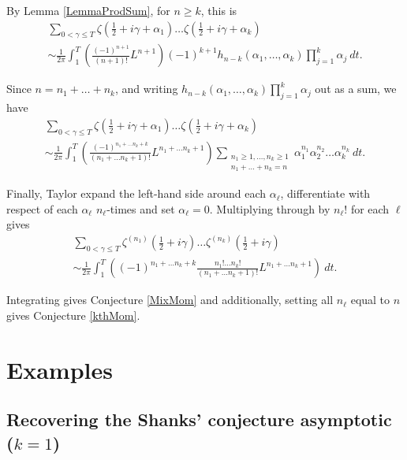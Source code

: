 \documentclass[12pt,a4paper,reqno]{amsart}
\theoremstyle{remark}
\numberwithin{equation}{section}
\begin{document}
By Lemma \ref{LemmaProdSum}, for $n \geq k$, this is
\begin{multline*}
\sum_{0 < \gamma \leq T}  \zeta \left( \frac{1}{2} + i \gamma + \alpha_1 \right)\dots\zeta \left( \frac{1}{2} + i \gamma + \alpha_k \right) \\
\sim \frac{1}{2 \pi} \int_{1}^{T} \left( \frac{(-1)^{n+1}}{(n+1)!} L^{n+1} \right) (-1)^{k+1} h_{n-k}(\alpha_1,\dots,\alpha_k) \prod_{j=1}^k \alpha_j \ dt.
\end{multline*}


Since $n=n_1+\dots +n_k$, and writing $ h_{n-k}(\alpha_1,\dots,\alpha_k) \prod_{j=1}^k \alpha_j $ out as a sum, we have
\begin{multline*}
\sum_{0 < \gamma \leq T}  \zeta \left( \frac{1}{2} + i \gamma + \alpha_1 \right)\dots\zeta \left( \frac{1}{2} + i \gamma + \alpha_k \right) \\
\sim \frac{1}{2 \pi} \int_{1}^{T} \left( \frac{(-1)^{n_1+\dots n_k+k}}{(n_1+\dots n_k+1)!} L^{n_1+\dots n_k+1} \right) \sum_{\substack{n_1 \geq 1,\dots,n_k \geq 1 \\ n_1 + \dots + n_k = n}} \alpha_1^{n_1} \alpha_2^{n_2} \dots \alpha_k^{n_{k}} \ dt.
\end{multline*}

Finally, Taylor expand the left-hand side around each $\alpha_\ell$, differentiate with respect of each $\alpha_\ell$ $n_\ell$-times and set $\alpha_\ell=0$. Multiplying through by $n_\ell!$ for each $\ell$ gives
\begin{multline*}
\sum_{0 < \gamma \leq T} \zeta^{(n_1)} \left( \frac{1}{2} + i \gamma \right) \dots \zeta^{(n_k)} \left( \frac{1}{2} + i \gamma \right) \\
\sim \frac{1}{2 \pi} \int_{1}^{T} \left( (-1)^{n_1+\dots n_k+k} \frac{n_1!\dots n_k!}{(n_1+\dots n_k+1)!} L^{n_1+\dots n_k+1} \right) \ dt.
\end{multline*}

Integrating gives Conjecture \ref{MixMom} and additionally, setting all $n_\ell$ equal to $n$ gives Conjecture \ref{kthMom}.



\section{Examples}\label{Examples}
\subsection{Recovering the Shanks' conjecture asymptotic ($k=1$)} \label{ShanksInt} \hfill
\end{document}
